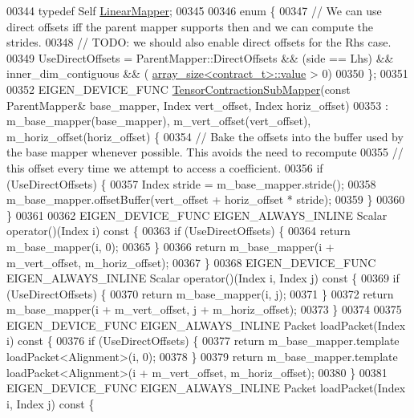 \begin{DoxyCode}
00344   \textcolor{keyword}{typedef} Self \hyperlink{class_eigen_1_1internal_1_1_tensor_contraction_sub_mapper}{LinearMapper};
00345 
00346   \textcolor{keyword}{enum} \{
00347     \textcolor{comment}{// We can use direct offsets iff the parent mapper supports then and we can compute the strides.}
00348     \textcolor{comment}{// TODO: we should also enable direct offsets for the Rhs case.}
00349     UseDirectOffsets = ParentMapper::DirectOffsets && (side == Lhs) && inner\_dim\_contiguous && (
      \hyperlink{struct_eigen_1_1internal_1_1array__size}{array\_size<contract\_t>::value} > 0)
00350   \};
00351 
00352   EIGEN\_DEVICE\_FUNC \hyperlink{class_eigen_1_1internal_1_1_tensor_contraction_sub_mapper}{TensorContractionSubMapper}(\textcolor{keyword}{const} ParentMapper& base\_mapper, 
      Index vert\_offset, Index horiz\_offset)
00353       : m\_base\_mapper(base\_mapper), m\_vert\_offset(vert\_offset), m\_horiz\_offset(horiz\_offset) \{
00354     \textcolor{comment}{// Bake the offsets into the buffer used by the base mapper whenever possible. This avoids the need to
       recompute}
00355     \textcolor{comment}{// this offset every time we attempt to access a coefficient.}
00356     \textcolor{keywordflow}{if} (UseDirectOffsets) \{
00357       Index stride = m\_base\_mapper.stride();
00358       m\_base\_mapper.offsetBuffer(vert\_offset + horiz\_offset * stride);
00359     \}
00360   \}
00361 
00362   EIGEN\_DEVICE\_FUNC EIGEN\_ALWAYS\_INLINE Scalar operator()(Index i)\textcolor{keyword}{ const }\{
00363     \textcolor{keywordflow}{if} (UseDirectOffsets) \{
00364       \textcolor{keywordflow}{return} m\_base\_mapper(i, 0);
00365     \}
00366     \textcolor{keywordflow}{return} m\_base\_mapper(i + m\_vert\_offset, m\_horiz\_offset);
00367   \}
00368   EIGEN\_DEVICE\_FUNC EIGEN\_ALWAYS\_INLINE Scalar operator()(Index i, Index j)\textcolor{keyword}{ const }\{
00369     \textcolor{keywordflow}{if} (UseDirectOffsets) \{
00370       \textcolor{keywordflow}{return} m\_base\_mapper(i, j);
00371     \}
00372     \textcolor{keywordflow}{return} m\_base\_mapper(i + m\_vert\_offset, j + m\_horiz\_offset);
00373   \}
00374 
00375   EIGEN\_DEVICE\_FUNC EIGEN\_ALWAYS\_INLINE Packet loadPacket(Index i)\textcolor{keyword}{ const }\{
00376     \textcolor{keywordflow}{if} (UseDirectOffsets) \{
00377       \textcolor{keywordflow}{return} m\_base\_mapper.template loadPacket<Alignment>(i, 0);
00378     \}
00379     \textcolor{keywordflow}{return} m\_base\_mapper.template loadPacket<Alignment>(i + m\_vert\_offset, m\_horiz\_offset);
00380   \}
00381   EIGEN\_DEVICE\_FUNC EIGEN\_ALWAYS\_INLINE Packet loadPacket(Index i, Index j)\textcolor{keyword}{ const }\{

\end{DoxyCode}
